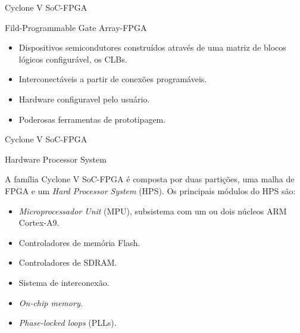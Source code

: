 \documentclass[10pt]{beamer}
\begin{document}
\begin{frame}{Cyclone V SoC-FPGA}
	\begin{alertblock}{Fild-Programmable Gate Array-FPGA}
		\vspace{0.25cm}
		\begin{itemize}
			\setlength\itemsep{1em}
			\item Dispositivos semicondutores construídos através de uma matriz de blocos lógicos configurável, os CLBs.
			\item Interconectáveis a partir de conexões programáveis.
			\item Hardware configuravel pelo usuário.
 			\item Poderosas ferramentas de prototipagem.
		\end{itemize}
	\end{alertblock}
\end{frame}

\begin{frame}{Cyclone V SoC-FPGA}
	\begin{alertblock}{Hardware Processor System}
		\vspace{0.1cm}
		\begin{justify}
			 A família Cyclone V SoC-FPGA é composta por duas partições, uma malha de FPGA e um \textit{Hard Processor System} (HPS). Os principais módulos do HPS são:
		\end{justify}
		\begin{itemize}
			\item \textit{Microprocessador Unit} (MPU), subsistema com um ou dois núcleos ARM Cortex-A9.
			\item Controladores de memória Flash.
			\item Controladores de SDRAM.
			\item Sistema de interconexão.
			\item \textit{On-chip memory}.
			\item \textit{Phase-locked loops} (PLLs).
		\end{itemize}
	\end{alertblock}
\end{frame}
\end{document}
